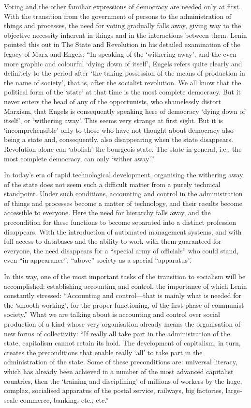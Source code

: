 \documentclass[12pt,a4paper,openany]{book}
\begin{document}
Voting and the other familiar expressions of democracy are needed only at first. With the transition from the government of persons to the administration of things and processes, the need for voting gradually falls away, giving way to the objective necessity inherent in things and in the interactions between them. Lenin pointed this out in The State and Revolution in his detailed examination of the legacy of Marx and Engels: “In speaking of the ‘withering away’, and the even more graphic and colourful ‘dying down of itself’, Engels refers quite clearly and definitely to the period after ‘the taking possession of the means of production in the name of society’, that is, after the socialist revolution. We all know that the political form of the ‘state’ at that time is the most complete democracy. But it never enters the head of any of the opportunists, who shamelessly distort Marxism, that Engels is consequently speaking here of democracy ‘dying down of itself’, or ‘withering away’. This seems very strange at first sight. But it is ‘incomprehensible’ only to those who have not thought about democracy also being a state and, consequently, also disappearing when the state disappears. Revolution alone can ‘abolish’ the bourgeois state. The state in general, i.e., the most complete democracy, can only ‘wither away’.”

In today’s era of rapid technological development, organising the withering away of the state does not seem such a difficult matter from a purely technical standpoint. Under such conditions, accounting and control in the administration of things and processes become a matter of technology, and their results become accessible to everyone. Here the need for hierarchy falls away, and the precondition for these functions to become separated into a distinct profession disappears. With the introduction of automated management systems, and with full access to databases and the ability to work with them guaranteed for everyone, the need disappears for a “special army of officials” who could stand, even “in appearance”, “above” society as a special “apparatus”.

In this way, one of the most important tasks of the transition to socialism will be accomplished: establishing accounting and control, the importance of which Lenin constantly stressed: “Accounting and control—that is mainly what is needed for the ‘smooth working’, for the proper functioning, of the first phase of communist society.” What we are talking about is accounting and control over social production of a kind whose very organisation already means the organisation of new forms of collectivity: “If really all take part in the administration of the state, capitalism cannot retain its hold. The development of capitalism, in turn, creates the preconditions that enable really ‘all’ to take part in the administration of the state. Some of these preconditions are: universal literacy, which has already been achieved in a number of the most advanced capitalist countries, then the ‘training and disciplining’ of millions of workers by the huge, complex, socialised apparatus of the postal service, railways, big factories, large-scale commerce, banking, etc., etc.”
\end{document}
